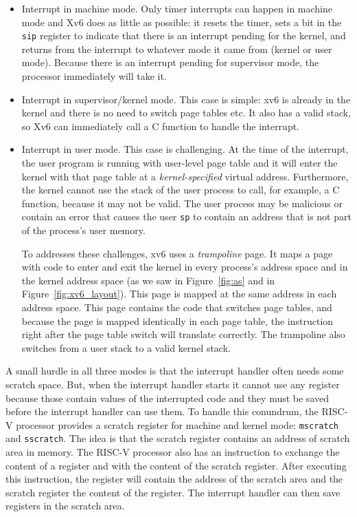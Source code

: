 \begin{itemize}
  
\item Interrupt in machine mode.  Only timer interrupts can happen in
  machine mode and Xv6 does as little as possible: it resets the
  timer, sets a bit in the \lstinline{sip} register to indicate that
  there is an interrupt pending for the kernel, and returns from the
  interrupt to whatever mode it came from (kernel or user mode).
  Because there is an interrupt pending for supervisor mode, the
  processor immediately will take it.

\item Interrupt in supervisor/kernel mode.  This case is simple: xv6
  is already in the kernel and there is no need to switch page tables
  etc. It also has a valid stack, so Xv6 can immediately call a C
  function to handle the interrupt.

\item Interrupt in user mode. This case is challenging.  At the time
  of the interrupt, the user program is running with user-level page
  table and it will enter the kernel with that page table at a
  \textit{kernel-specified} virtual address. Furthermore, the kernel
  cannot use the stack of the user process to call, for example, a C
  function, because it may not be valid.  The user process may be
  malicious or contain an error that causes the user \texttt{sp} to
  contain an address that is not part of the process's user memory.

  To addresses these challenges, xv6 uses a
  \textit{trampoline} page.  It maps a page with
  code to enter and exit the kernel in every process's address space
  and in the kernel address space (as we saw in Figure~\ref{fig:as}
  and in Figure~\ref{fig:xv6_layout}).  This page is mapped at the
  same address in each address space.  This page contains the code
  that switches page tables, and because the page is mapped
  identically in each page table, the instruction right after the page
  table switch will translate correctly.  The trampoline also switches
  from a user stack to a valid kernel stack.

\end{itemize}

A small hurdle in all three modes is that the interrupt handler
often needs some scratch space. But, when the interrupt handler starts
it cannot use any register because those contain values of the
interrupted code and they must be saved before the interrupt handler
can use them. To handle this conundrum, the RISC-V processor provides
a scratch register for machine and kernel mode:
\lstinline{mscratch} and
\lstinline{sscratch}.  The idea is
that the scratch register contains an address of scratch area in
memory.  The RISC-V processor also has an instruction to exchange the
content of a register and with the content of the scratch
register. After executing this instruction, the register will contain
the address of the scratch area and the scratch register the content
of the register. The interrupt handler can then save registers in the
scratch area.

